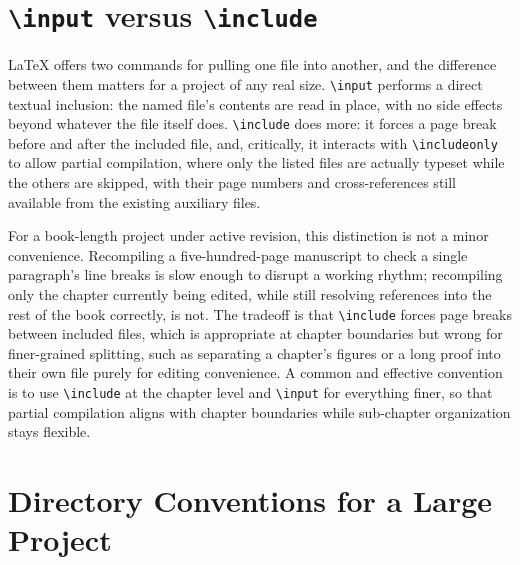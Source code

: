\hypertarget{input-versus-include}{%
\section{\texorpdfstring{\texttt{\textbackslash{}input} versus \texttt{\textbackslash{}include}}{\textbackslash input versus \textbackslash include}}\label{input-versus-include}}

LaTeX offers two commands for pulling one file into another, and the difference between them matters for a project of any real size. \texttt{\textbackslash{}input} performs a direct textual inclusion: the named file's contents are read in place, with no side effects beyond whatever the file itself does. \texttt{\textbackslash{}include} does more: it forces a page break before and after the included file, and, critically, it interacts with \texttt{\textbackslash{}includeonly} to allow partial compilation, where only the listed files are actually typeset while the others are skipped, with their page numbers and cross-references still available from the existing auxiliary files.

For a book-length project under active revision, this distinction is not a minor convenience. Recompiling a five-hundred-page manuscript to check a single paragraph's line breaks is slow enough to disrupt a working rhythm; recompiling only the chapter currently being edited, while still resolving references into the rest of the book correctly, is not. The tradeoff is that \texttt{\textbackslash{}include} forces page breaks between included files, which is appropriate at chapter boundaries but wrong for finer-grained splitting, such as separating a chapter's figures or a long proof into their own file purely for editing convenience. A common and effective convention is to use \texttt{\textbackslash{}include} at the chapter level and \texttt{\textbackslash{}input} for everything finer, so that partial compilation aligns with chapter boundaries while sub-chapter organization stays flexible.

\hypertarget{directory-conventions-for-a-large-project}{%
\section{Directory Conventions for a Large Project}\label{directory-conventions-for-a-large-project}}

